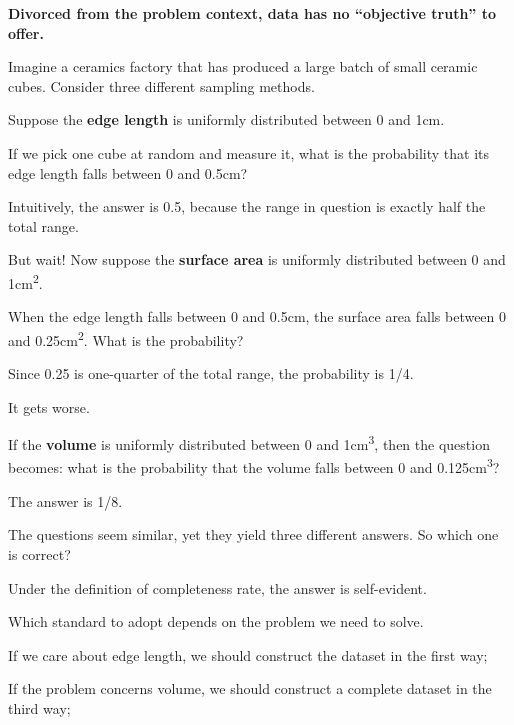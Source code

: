 \textbf{Divorced from the problem context, data has no ``objective truth'' to offer.}

\begin{myquote}
Imagine a ceramics factory that has produced a large batch of small ceramic cubes. Consider three different sampling methods.

\vspace{1em}

Suppose the \textbf{edge length} is uniformly distributed between 0 and 1cm.

If we pick one cube at random and measure it, what is the probability that its edge length falls between 0 and 0.5cm?

Intuitively, the answer is 0.5, because the range in question is exactly half the total range.

\vspace{1em}

But wait! Now suppose the \textbf{surface area} is uniformly distributed between 0 and 1cm\textsuperscript{2}.

When the edge length falls between 0 and 0.5cm, the surface area falls between 0 and 0.25cm\textsuperscript{2}. What is the probability?

Since 0.25 is one-quarter of the total range, the probability is 1/4.

\vspace{1em}

It gets worse.

If the \textbf{volume} is uniformly distributed between 0 and 1cm\textsuperscript{3}, then the question becomes:
what is the probability that the volume falls between 0 and 0.125cm\textsuperscript{3}?

The answer is 1/8.

\vspace{1em}

The questions seem similar, yet they yield three different answers. So which one is correct?

\end{myquote}

Under the definition of completeness rate, the answer is self-evident.

Which standard to adopt depends on the problem we need to solve.

If we care about edge length, we should construct the dataset in the first way;

If the problem concerns volume, we should construct a complete dataset in the third way;

